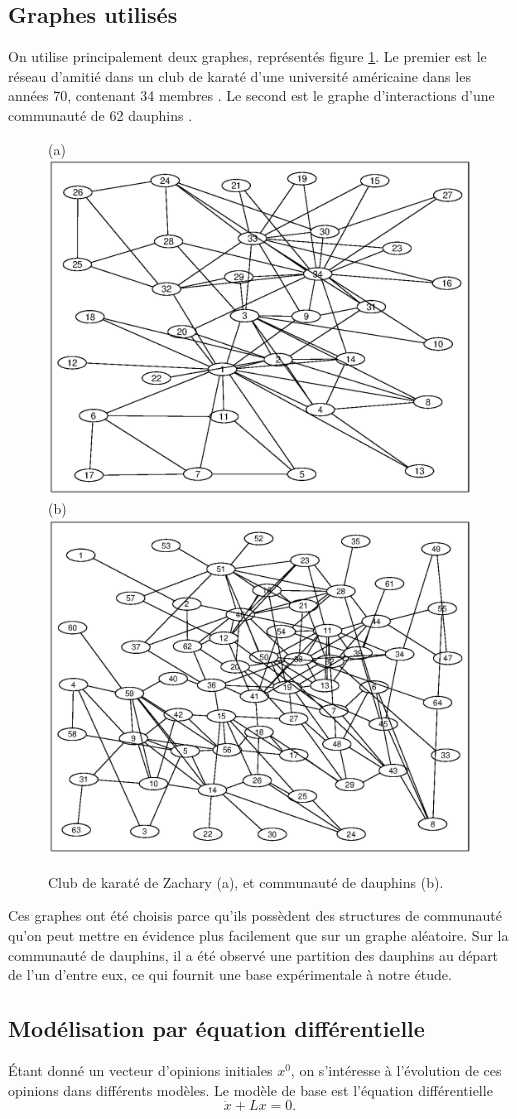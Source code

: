 \documentclass[12pt]{article}
\begin{document}
\subsection{Graphes utilisés}
On utilise principalement deux graphes, représentés figure
\ref{graphes}.  Le premier est le réseau d'amitié dans un club de
karaté d'une université américaine dans les années 70, contenant 34
membres \cite{zachary}. Le second est le graphe d'interactions d'une
communauté de 62 dauphins \cite{dolphins}.

\begin{figure}[htb]
  \centering
  (a)
  \includegraphics[width=.4 \textwidth]{zachary}
  (b)
  \includegraphics[width=.4 \textwidth]{dolphins}
  \caption{Club de karaté de Zachary (a), et communauté de dauphins (b).}
  \label{graphes}
\end{figure}

Ces graphes ont été choisis parce qu'ils possèdent des
structures de communauté qu'on peut mettre en évidence plus
facilement que sur un graphe aléatoire. Sur la communauté de
dauphins, il a été observé une partition des dauphins au départ
de l'un d'entre eux, ce qui fournit une base expérimentale à
notre étude.

\subsection{Modélisation par équation différentielle}
Étant donné un vecteur d'opinions initiales $x^0$, on
s'intéresse à l'évolution de ces opinions dans différents
modèles. Le modèle de base est l'équation différentielle
\begin{equation}
  \label{eq_diff}
  \dot x + L x = 0.
\end{equation}
\end{document}
